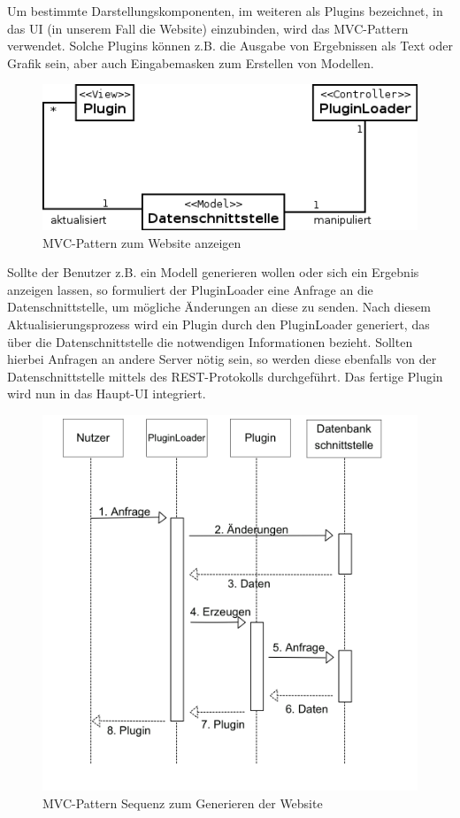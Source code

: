 
Um bestimmte Darstellungskomponenten, im weiteren als Plugins bezeichnet, in das UI (in unserem Fall die Website) einzubinden, wird das MVC-Pattern verwendet. Solche Plugins können z.B. die Ausgabe von Ergebnissen als Text oder Grafik sein, aber auch Eingabemasken zum Erstellen von Modellen. 

\begin{figure}[h]
\centering
\includegraphics[width=0.6\linewidth]{Grafik/Diagramm/Pattern/MVC/Kontextdiagramm.png}
\caption[MVC Website Klassen]{MVC-Pattern zum Website anzeigen}
\end{figure}

\noindent Sollte der Benutzer z.B. ein Modell generieren wollen oder sich ein Ergebnis anzeigen lassen, so formuliert der PluginLoader eine Anfrage an die Datenschnittstelle, um mögliche Änderungen an diese zu senden. Nach diesem Aktualisierungsprozess wird ein Plugin durch den PluginLoader generiert, das über die Datenschnittstelle die notwendigen Informationen bezieht. Sollten hierbei Anfragen an andere Server nötig sein, so werden diese ebenfalls von der Datenschnittstelle mittels des REST-Protokolls durchgeführt. Das fertige Plugin wird nun in das Haupt-UI integriert.

\begin{figure}[h]
\centering
\includegraphics[width=0.6\linewidth]{Grafik/Diagramm/Pattern/MVC/Sequenzdiagramm.png}
\caption[MVC Website Sequenz]{MVC-Pattern Sequenz zum Generieren der Website}
\end{figure}


